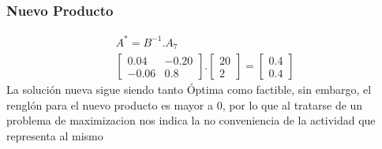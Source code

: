 \begin{homeworkProblem}[-1][Laboratorio]
\subsubsection{Nuevo Producto}
\begin{align*}
A^{*}=B^{-1}.A_7\\
    \begin{bmatrix}
        0.04 & -0.20 \\
        -0.06 & 0.8
    \end{bmatrix}.
    \begin{bmatrix}
        20 \\
        2        
    \end{bmatrix}=
    \begin{bmatrix}
        0.4 \\
        0.4
    \end{bmatrix}
\end{align*}
La solución nueva sigue siendo tanto Óptima como factible, sin embargo, el renglón \zero para el nuevo producto es mayor a $0$, por lo que al tratarse de un problema de maximizacion nos indica la no conveniencia de la actividad que representa al mismo
\end{homeworkProblem}